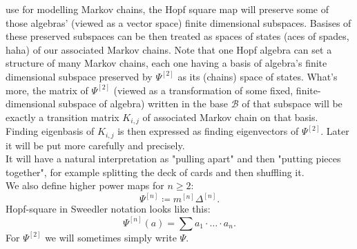 \documentclass[a4paper, 12pt]{article}
\begin{document}
use for modelling Markov chains, the Hopf square map will preserve some of those algebras'
(viewed as a vector space) finite dimensional subspaces. Basises of these preserved
subspaces can be then treated as spaces of states (aces of spades, haha)
of our associated Markov chains. Note that one Hopf algebra can set a structure of many Markov chains,
each one having a basis of algebra's finite dimensional subspace preserved by $\Psi^{[2]}$ as its (chains)
space of states.
What's more, the matrix of $\Psi^{[2]}$ (viewed as a transformation of some fixed, finite-dimensional
subspace of algebra)
written in the base $\mathcal{B}$ of that subspace will be exactly a transition matrix
$K_{i,j}$ of associated Markov chain on that basis. Finding eigenbasis of $K_{i,j}$ is then expressed as
finding eigenvectors of $\Psi^{[2]}$. Later it will be put more carefully and precisely. \\
It will have a natural interpretation as "pulling apart" and then "putting pieces together", for
example splitting the deck of cards and then shuffling it. \\[4pt]
We also define higher power maps for $n \geq 2$:
\begin{equation*}
\Psi^{[n]} \coloneqq m^{[n]}\Delta^{[n]}.
\end{equation*}
Hopf-square in Sweedler notation looks like this:
\begin{equation*}
\Psi^{[n]}(a) = \sum a_1 \cdot \ldots \cdot a_n.
\end{equation*}
For $\Psi^{[2]}$ we will sometimes simply write $\Psi$.
\end{document}
